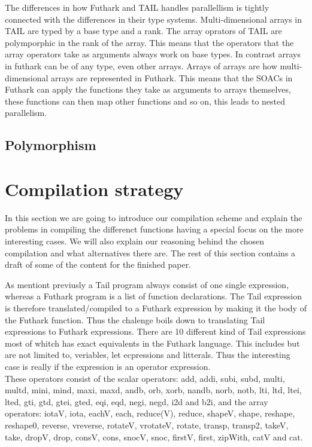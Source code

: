 \documentclass[11pt]{article}
\begin{document}
The differences in how Futhark and TAIL handles parallellism is tightly connected with the differences in their type systems.
Multi-dimensional arrays in TAIL are typed by a base type and a rank. The array oprators of TAIL are polymporphic in the rank
of the array. This means that the operators that the array operators take as arguments always work on base types. In contrast
arrays in futhark can be of any type, even other arrays. Arrays of arrays are how multi-dimensional arrays are represented in Futhark.
This means that the SOACs in Futhark can apply the functions they take as arguments to arrays themselves, these functions can then
map other functions and so on, this leads to nested parallelism.

\subsection{Polymorphism}

\section{Compilation strategy}
In this section we are going to introduce our compilation scheme and explain the problems in compiling the differenct functions having a special focus on the more interesting cases. We will also explain our reasoning behind the chosen compilation and what alternatives there are. The rest of this section contains a draft of some of the content for the finished paper. 

As mentiont previusly a Tail program always consist of one single expression, whereas a Futhark program is a list of function declarations. The Tail expression is therefore translated/compiled to a Futhark expression by making it the body of the Futhark function. 
Thus the chalenge boils down to translating Tail expressions to Futhark expressions. 
There are 10 different kind of Tail expressions most of whitch has exact equivalents in the Futhark language. This includes but are not limited to, veriables, let ecpressions and litterals. Thus the interesting case is really if the expression is an operator expression. \\

These operators consist of the scalar operators: add, addi, subi, subd, multi, multd, mini, mind, maxi, maxd, andb, orb, xorb, nandb, norb, notb, lti, ltd, ltei, lted, gti, gtd, gtei, gted, eqi, eqd, negi, negd, i2d and b2i, and the array operators: iotaV, iota, eachV, each, reduce(V), reduce, shapeV, shape, reshape, reshape0, reverse, vreverse, rotateV, vrotateV, rotate, transp, transp2, takeV, take, dropV, drop, consV, cons, snocV, snoc, firstV, first, zipWith, catV and cat. \\
\end{document}
